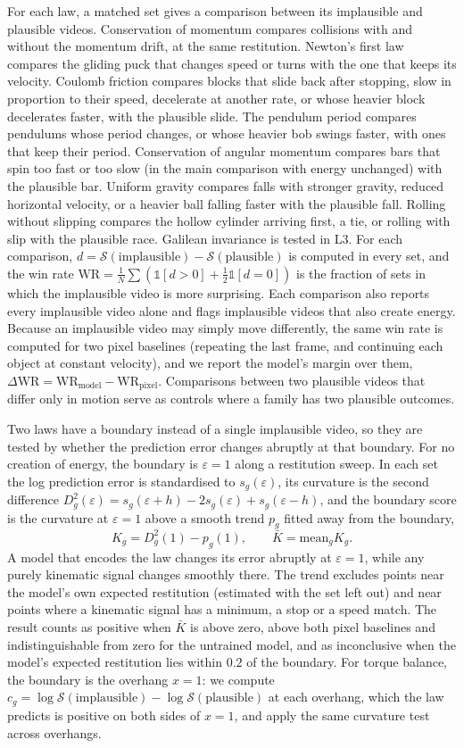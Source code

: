 \documentclass[10pt]{article}
\newcommand{\eps}{\varepsilon}
\newcommand{\ind}{\mathbb{1}}
\begin{document}
For each law, a matched set gives a comparison between its implausible and plausible videos. Conservation of momentum
compares collisions with and without the momentum drift, at the same restitution. Newton's first law compares the
gliding puck that changes speed or turns with the one that keeps its velocity. Coulomb friction compares blocks that
slide back after stopping, slow in proportion to their speed, decelerate at another rate, or whose heavier block
decelerates faster, with the plausible slide. The pendulum period compares pendulums
whose period changes, or whose heavier bob swings faster, with ones that keep their period. Conservation of angular
momentum compares bars that spin too fast or too slow (in the main comparison with energy unchanged) with the plausible
bar. Uniform gravity compares falls with stronger gravity, reduced horizontal velocity, or a heavier ball falling
faster with the plausible fall. Rolling without slipping compares the hollow cylinder arriving first, a tie, or rolling
with slip with the plausible race. Galilean invariance is tested in L3. For each comparison, $d=\mathcal
S(\text{implausible})-\mathcal S(\text{plausible})$ is computed in every set, and the win rate
$\mathrm{WR}=\frac1N\sum(\ind[d>0]+\frac12\ind[d=0])$ is the fraction of sets in which the implausible video is more
surprising. Each comparison also reports every implausible video alone and flags implausible videos that also create
energy. Because an implausible video may simply move differently, the same win rate is computed for two pixel
baselines (repeating the last frame, and continuing each object at constant velocity), and we report the model's
margin over them, $\Delta\mathrm{WR}=\mathrm{WR}_{\mathrm{model}}-\mathrm{WR}_{\mathrm{pixel}}$. Comparisons between two
plausible videos that differ only in motion serve as controls where a family has two plausible outcomes.

Two laws have a boundary instead of a single implausible video, so they are tested by whether the prediction error
changes abruptly at that boundary. For no creation of energy, the boundary is $\eps=1$ along a restitution sweep. In
each set the log prediction error is standardised to $s_g(\eps)$, its curvature is the second difference
$D^2_g(\eps)=s_g(\eps+h)-2s_g(\eps)+s_g(\eps-h)$, and the boundary score is the curvature at $\eps=1$ above a smooth trend
$p_g$ fitted away from the boundary,
\[
K_g=D^2_g(1)-p_g(1),\qquad \bar K=\mathrm{mean}_g K_g .
\]
A model that encodes the law changes its error abruptly at $\eps=1$, while any purely kinematic signal changes
smoothly there. The trend excludes points near the model's own expected restitution (estimated with the set left out) and near points
where a kinematic signal has a minimum, a stop or a speed match. The result counts as positive when $\bar K$ is above zero, above both pixel baselines and
indistinguishable from zero for the untrained model, and as inconclusive when the model's expected restitution lies
within $0.2$ of the boundary. For torque balance, the boundary is the overhang $x=1$: we compute $c_g=\log\mathcal
S(\text{implausible})-\log\mathcal S(\text{plausible})$ at each overhang, which the law predicts is positive on both
sides of $x=1$, and apply the same curvature test across overhangs.
\end{document}
